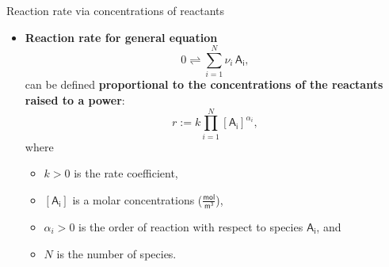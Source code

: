 %
\begin{frame}[shrink]{Reaction rate via concentrations of reactants}
%
\begin{itemize}
\item \alert{\bf Reaction rate for general equation}
%
\[0 \rightleftharpoons \sum_{i=1}^{N} \nu_i \, \mathsf{A_i},\]
%
can be defined {\bf proportional to the concentrations of the reactants raised to a power}:
%
\[r := k \prod_{i=1}^{N} [\mathsf{A_i}]^{\alpha_i},\]
%
where
%
\begin{itemize}
	\item $k > 0$ is the rate coefficient, 
	\item $[\mathsf{A_i}]$ is a molar concentrations ($\mathsf{\tfrac{mol}{m^3}}$), 
	\item $\alpha_i > 0$ is the order of reaction with respect to species $\mathsf{A_i}$, %
	and 
	\item $N$ is the number of species.
\end{itemize}
%
\end{itemize}
%
\end{frame}
%
%
